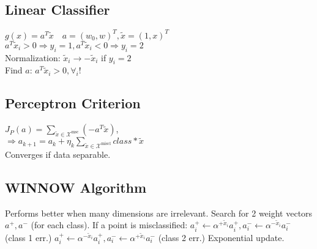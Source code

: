 
\subsection*{Linear Classifier}
$g(x)=a^T\tilde{x}\quad a=(w_0,w)^T, \tilde{x}=(1,x)^T$\\
$a^T\tilde{x}_i>0 \Rightarrow y_i=1, a^T\tilde{x}_i<0 \Rightarrow y_i=2$\\
Normalization: $\tilde{x}_i\rightarrow-\tilde{x}_i$ if $y_i=2$ \\
Find $a$: $a^T\tilde{x}_i>0,\forall_i$!
\subsection*{Perceptron Criterion}
$J_P(a)=\sum_{\tilde{x}\in\mathcal{X}^\text{msc}}(-a^T\tilde{x})$,\\
$\Rightarrow a_{k+1}=a_k+\eta_k \sum_{\tilde{x}\in\mathcal{X}^\text{miscl}} class* \tilde{x}$\\
Converges if data separable.
\subsection*{WINNOW Algorithm}
Performs better when many dimensions are irrelevant. Search for 2 weight vectors $a^+, a^-$ (for each class). If a point is misclassified:
$a_i^+ {\leftarrow} \alpha^{+\tilde{x}_i}a_i^+, a_i^- {\leftarrow} \alpha^{-\tilde{x}_i}a_i^-$ (class 1 err.)
$a_i^+ {\leftarrow} \alpha^{-\tilde{x}_i}a_i^+, a_i^- {\leftarrow} \alpha^{+\tilde{x}_i}a_i^-$ (class 2 err.)
Exponential update.

